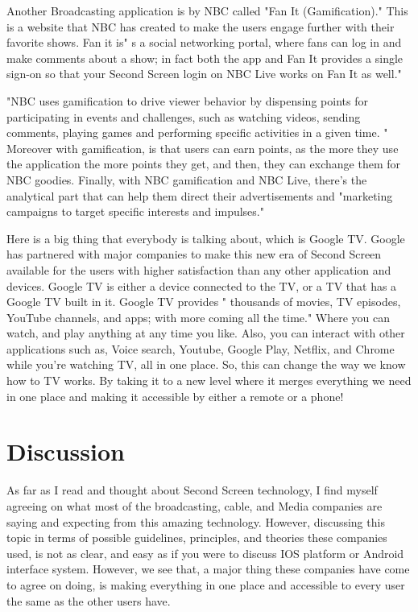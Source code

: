\documentclass[12pt, oneside]{amsart}   	%
\begin{document}
Another Broadcasting application is by NBC called "Fan It (Gamification)." This is a website that NBC has created to make the users engage further with their favorite shows.  Fan it is" s a social networking portal, where fans can log in and make comments about a show; in fact both the app and Fan It provides a single sign-on so that your Second Screen login on NBC Live works on Fan It as well." \cite{Second-Screen-Art}

"NBC uses gamification to drive viewer behavior by dispensing points for participating in events and 
challenges, such as watching videos, sending comments, playing games and performing specific 
activities in a given time. "\cite{Second-Screen-Art}  Moreover with gamification, is that users can earn points, as the more they use the application the more points they get, and then, they can exchange them for NBC goodies.  Finally, with NBC gamification and NBC Live, there's the analytical part that can help them direct their advertisements and "marketing campaigns to target specific interests and 
impulses."\cite{Second-Screen-Art} %

Here is a big thing that everybody is talking about, which is Google TV.  Google has partnered with major companies to make this new era of Second Screen available for the users with higher satisfaction than any other application and devices.  Google TV is either a device connected to the TV, or a TV that has a Google TV built in it.  Google TV provides " thousands of movies, TV episodes, YouTube channels, and apps; with more coming all the time."\cite{Google} Where you can watch, and play anything at any time you like. Also, you can interact with other applications such as, Voice search, Youtube, Google Play, Netflix, and Chrome while you're watching TV, all in one place.  So, this can change the way we know how to TV works. By taking it to a new level where it merges everything we need in one place and making it accessible by either a remote or a phone!
  \section{Discussion}

  As far as I read and thought about Second Screen technology, I find myself agreeing on what most of the broadcasting, cable, and Media companies are saying and expecting from this amazing technology.  However, discussing this topic in terms of possible guidelines, principles, and theories these companies used, is not as clear, and easy as if you were to discuss IOS platform or Android interface system.  However, we see that, a major thing these companies have come to agree on doing, is making everything in one place and accessible to every user the same as the other users have.
\end{document}
